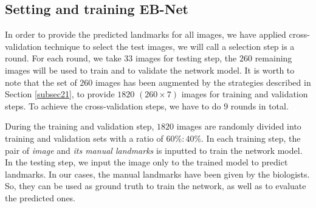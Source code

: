 \documentclass[review]{elsarticle}
\begin{document}
\subsection{Setting and training EB-Net}
\label{subsec23}
In order to provide the predicted landmarks for all images, we have applied cross-validation technique to select the test images, we will call a selection step is a round. For each round, we take $33$ images for testing step, the $260$ remaining images will be used to train and to validate the network model. It is worth to note that the set of $260$ images has been augmented by the strategies described in Section \ref{subsec21}, to provide $1820$ $(260 \times 7)$ images for training and validation steps. To achieve the cross-validation steps, we have to do $9$ rounds in total. 

During the training and validation step, $1820$ images are randomly divided into training and validation sets with a ratio of $60\%:40\%$. In each training step, the pair of \textit{image} and \textit{its manual landmarks} is inputted to train the network model. In the testing step, we input the image only to the trained model to predict landmarks. In our cases, the manual landmarks have been given by the biologists. So, they can be used as ground truth to train the network, as well as to evaluate the predicted ones. 
\end{document}
